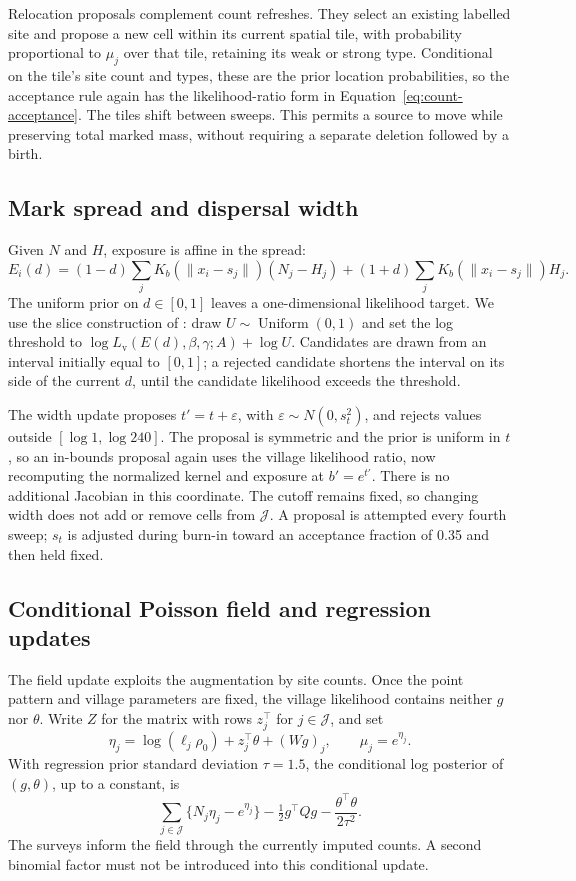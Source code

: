 Relocation proposals complement count refreshes. They select an existing labelled site and propose a new cell within its current spatial tile, with probability proportional to $\mu_j$ over that tile, retaining its weak or strong type. Conditional on the tile's site count and types, these are the prior location probabilities, so the acceptance rule again has the likelihood-ratio form in Equation~\eqref{eq:count-acceptance}. The tiles shift between sweeps. This permits a source to move while preserving total marked mass, without requiring a separate deletion followed by a birth.

\subsection{Mark spread and dispersal width}

Given $N$ and $H$, exposure is affine in the spread:
\[
 E_i(d)=(1-d)\sum_j K_b(\|x_i-s_j\|)(N_j-H_j)
       +(1+d)\sum_j K_b(\|x_i-s_j\|)H_j.
\]
The uniform prior on $d\in[0,1]$ leaves a one-dimensional likelihood target. We use the slice construction of \citet[Section~4]{neal2003}: draw $U\sim\operatorname{Uniform}(0,1)$ and set the log threshold to $\log L_{\mathrm v}(E(d),\beta,\gamma;A)+\log U$. Candidates are drawn from an interval initially equal to $[0,1]$; a rejected candidate shortens the interval on its side of the current $d$, until the candidate likelihood exceeds the threshold.

The width update proposes $t'=t+\varepsilon$, with $\varepsilon\sim N(0,s_t^2)$, and rejects values outside $[\log 1,\log 240]$. The proposal is symmetric and the prior is uniform in $t$, so an in-bounds proposal again uses the village likelihood ratio, now recomputing the normalized kernel and exposure at $b'=e^{t'}$. There is no additional Jacobian in this coordinate. The cutoff remains fixed, so changing width does not add or remove cells from $\mathcal J$. A proposal is attempted every fourth sweep; $s_t$ is adjusted during burn-in toward an acceptance fraction of 0.35 and then held fixed.

\subsection{Conditional Poisson field and regression updates}

The field update exploits the augmentation by site counts. Once the point pattern and village parameters are fixed, the village likelihood contains neither $g$ nor $\theta$. Write $Z$ for the matrix with rows $z_j^\top$ for $j\in\mathcal J$, and set
\[
 \eta_j=\log(\ell_j\rho_0)+z_j^\top\theta+(Wg)_j,
 \qquad \mu_j=e^{\eta_j}.
\]
With regression prior standard deviation $\tau=1.5$, the conditional log posterior of $(g,\theta)$, up to a constant, is
\begin{equation}\label{eq:poisson-field-target}
 \sum_{j\in\mathcal J}\{N_j\eta_j-e^{\eta_j}\}
 -\tfrac12g^\top Qg-\frac{\theta^\top\theta}{2\tau^2}.
\end{equation}
The surveys inform the field through the currently imputed counts. A second binomial factor must not be introduced into this conditional update.

